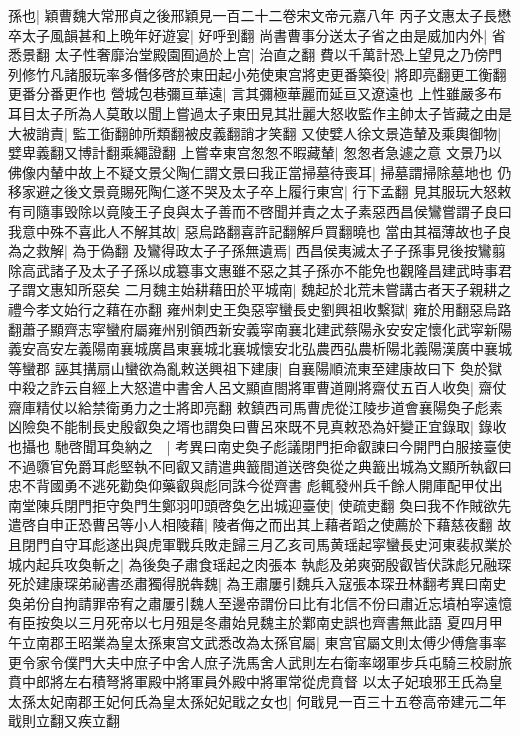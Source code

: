 孫也|{
	穎曹魏大常邢貞之後邢穎見一百二十二卷宋文帝元嘉八年}
丙子文惠太子長懋卒太子風韻甚和上晩年好遊宴|{
	好呼到翻}
尚書曹事分送太子省之由是威加内外|{
	省悉景翻}
太子性奢靡治堂殿園囿過於上宫|{
	治直之翻}
費以千萬計恐上望見之乃傍門列修竹凡諸服玩率多僭侈啓於東田起小苑使東宫將吏更番築役|{
	將即亮翻更工衡翻更番分番更作也}
營城包巷彌亘華遠|{
	言其彌極華麗而延亘又遼遠也}
上性雖嚴多布耳目太子所為人莫敢以聞上嘗過太子東田見其壯麗大怒收監作主帥太子皆藏之由是大被誚責|{
	監工衘翻帥所類翻被皮義翻誚才笑翻}
又使嬖人徐文景造輦及乘輿御物|{
	嬖卑義翻又博計翻乘繩證翻}
上嘗幸東宫怱怱不暇藏輦|{
	怱怱者急遽之意}
文景乃以佛像内輦中故上不疑文景父陶仁謂文景曰我正當掃墓待喪耳|{
	掃墓謂掃除墓地也}
仍移家避之後文景竟賜死陶仁遂不哭及太子卒上履行東宫|{
	行下孟翻}
見其服玩大怒敕有司隨事毁除以竟陵王子良與太子善而不啓聞并責之太子素惡西昌侯鸞嘗謂子良曰我意中殊不喜此人不解其故|{
	惡烏路翻喜許記翻解戶買翻曉也}
當由其福薄故也子良為之救解|{
	為于偽翻}
及鸞得政太子子孫無遺焉|{
	西昌侯夷滅太子子孫事見後按鸞翦除高武諸子及太子子孫以成簒事文惠雖不惡之其子孫亦不能免也觀隆昌建武時事君子謂文惠知所惡矣}
二月魏主始耕藉田於平城南|{
	魏起於北荒未嘗講古者天子親耕之禮今孝文始行之藉在亦翻}
雍州刺史王奐惡寜蠻長史劉興祖收繫獄|{
	雍於用翻惡烏路翻蕭子顯齊志寜蠻府屬雍州别領西新安義寜南襄北建武蔡陽永安安定懷化武寜新陽義安高安左義陽南襄城廣昌東襄城北襄城懷安北弘農西弘農析陽北義陽漢廣中襄城等蠻郡}
誣其搆扇山蠻欲為亂敕送興祖下建康|{
	自襄陽順流東至建康故曰下}
奐於獄中殺之詐云自經上大怒遣中書舍人呂文顯直閤將軍曹道剛將齋仗五百人收奐|{
	齋仗齋庫精仗以給禁衛勇力之士將即亮翻}
敕鎮西司馬曹虎從江陵步道會襄陽奐子彪素凶險奐不能制長史殷叡奐之壻也謂奐曰曹呂來既不見真敕恐為奸變正宜錄取|{
	錄收也攝也}
馳啓聞耳奐納之　|{
	考異曰南史奐子彪議閉門拒命叡諫曰今開門白服接臺使不過隳官免爵耳彪堅執不囘叡又請遣典籖間道送啓奐從之典籖出城為文顯所執叡曰忠不背國勇不逃死勸奐仰藥叡與彪同誅今從齊書}
彪輒發州兵千餘人開庫配甲仗出南堂陳兵閉門拒守奐門生鄭羽叩頭啓奐乞出城迎臺使|{
	使疏吏翻}
奐曰我不作賊欲先遣啓自申正恐曹呂等小人相陵藉|{
	陵者侮之而出其上藉者蹈之使薦於下藉慈夜翻}
故且閉門自守耳彪遂出與虎軍戰兵敗走歸三月乙亥司馬黄瑶起寜蠻長史河東裴叔業於城内起兵攻奐斬之|{
	為後奐子肅食瑶起之肉張本}
執彪及弟爽弼殷叡皆伏誅彪兄融琛死於建康琛弟祕書丞肅獨得脱犇魏|{
	為王肅屢引魏兵入寇張本琛丑林翻考異曰南史奐弟份自拘請罪帝宥之肅屢引魏人至邊帝謂份曰比有北信不份曰肅近忘墳柏寜遠憶有臣按奐以三月死帝以七月殂是冬肅始見魏主於鄴南史誤也齊書無此語}
夏四月甲午立南郡王昭業為皇太孫東宫文武悉改為太孫官屬|{
	東宫官屬文則太傅少傅詹事率更令家令僕門大夫中庶子中舍人庶子洗馬舍人武則左右衛率翊軍步兵屯騎三校尉旅賁中郎將左右積弩將軍殿中將軍員外殿中將軍常從虎賁督}
以太子妃琅邪王氏為皇太孫太妃南郡王妃何氏為皇太孫妃妃戢之女也|{
	何戢見一百三十五卷高帝建元二年戢則立翻又疾立翻}
